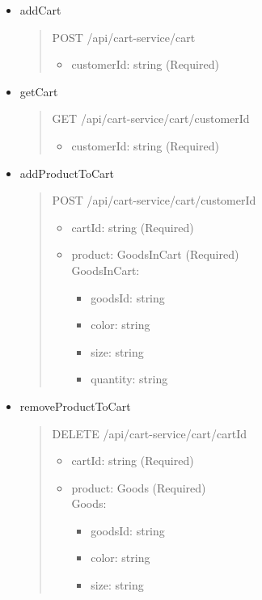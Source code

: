 \begin{itemize}
	\item addCart
	      \begin{quote}
		      POST /api/cart-service/cart
		      \begin{itemize}
			      \item customerId: string (Required)
		      \end{itemize}
	      \end{quote}

	\item getCart
	      \begin{quote}
		      GET /api/cart-service/cart/{customerId}
		      \begin{itemize}
			      \item customerId: string (Required)
		      \end{itemize}
	      \end{quote}

	\item addProductToCart
	      \begin{quote}
		      POST /api/cart-service/cart/{customerId}
		      \begin{itemize}
			      \item cartId: string (Required)
			      \item product: GoodsInCart (Required)\\
			            GoodsInCart:
			            \begin{itemize}
				            \item goodsId: string
				            \item color: string
				            \item size: string
				            \item quantity: string
			            \end{itemize}
		      \end{itemize}
	      \end{quote}

	\item removeProductToCart
	      \begin{quote}
		      DELETE /api/cart-service/cart/{cartId}
		      \begin{itemize}
			      \item cartId: string (Required)
			      \item product: Goods (Required)\\
			            Goods:
			            \begin{itemize}
				            \item goodsId: string
				            \item color: string
				            \item size: string
			            \end{itemize}
		      \end{itemize}
	      \end{quote}


\end{itemize}
